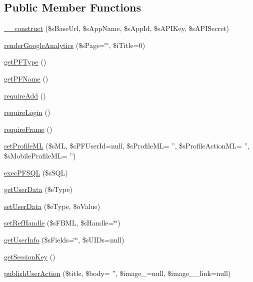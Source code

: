 \subsection*{Public Member Functions}
\begin{DoxyCompactItemize}
\item 
\hyperlink{classSF__Facebook_af4ffb9f9b6b1b542479f3134e6e3d918}{\_\-\_\-construct} (\$sBaseUrl, \$sAppName, \$sAppId, \$sAPIKey, \$sAPISecret)
\item 
\hyperlink{classSF__Facebook_aa3a5bc9c0f82eddaa51e3819c65161e6}{renderGoogleAnalytics} (\$sPage=\char`\"{}\char`\"{}, \$iTitle=0)
\item 
\hyperlink{classSF__Facebook_a3606743752a94277695713e909058e13}{getPFType} ()
\item 
\hyperlink{classSF__Facebook_ae54fd14fc0c3886a038431868ac4fbc7}{getPFName} ()
\item 
\hyperlink{classSF__Facebook_a2104a9897a2bd81518382cb07a0b41cf}{requireAdd} ()
\item 
\hyperlink{classSF__Facebook_a8279b755615299d23d0989e9330ea638}{requireLogin} ()
\item 
\hyperlink{classSF__Facebook_a2f3c6eb30cc80a28261ed06074224f12}{requireFrame} ()
\item 
\hyperlink{classSF__Facebook_a24c354534c9265c4a7cbd73c0f82ba56}{setProfileML} (\$sML, \$sPFUserId=null, \$sProfileML= '', \$sProfileActionML= '', \$sMobileProfileML= '')
\item 
\hyperlink{classSF__Facebook_aea9e29722f6d4ecdfab07f196e132bcb}{execPFSQL} (\$sSQL)
\item 
\hyperlink{classSF__Facebook_abef0629a5601043cbfa3ea8b1c5865e7}{getUserData} (\$eType)
\item 
\hyperlink{classSF__Facebook_a457014f98badf8555216fcfb66db27df}{setUserData} (\$eType, \$oValue)
\item 
\hyperlink{classSF__Facebook_aa70ade6295aedd084a68f97b27441c3b}{setRefHandle} (\$sFBML, \$sHandle=\char`\"{}\char`\"{})
\item 
\hyperlink{classSF__Facebook_aad5709bf4b030e39bc8e7e2cbf4812a5}{getUserInfo} (\$sFields=\char`\"{}\char`\"{}, \$sUIDs=null)
\item 
\hyperlink{classSF__Facebook_a71b7a74bd23b2c2be77aad5448cda40b}{getSessionKey} ()
\item 
\hyperlink{classSF__Facebook_a1b675b86fea379a2fffe42a929336863}{publishUserAction} (\$title, \$body= '', \$image\_=null, \$image\_\_\-link=null)
\item 

\end{DoxyCompactItemize}
